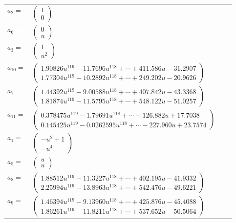 \documentclass[1p]{elsarticle_modified}
\theoremstyle{definition}
\begin{document}
\begin{tabular}{m{7pt} m{180pt} m{7pt} m{180pt} }
\flushright $a_{2}=$&$\begin{pmatrix}1\\0\end{pmatrix}$ \\
\flushright $a_{6}=$&$\begin{pmatrix}0\\u\end{pmatrix}$ \\
\flushright $a_{3}=$&$\begin{pmatrix}1\\u^2\end{pmatrix}$ \\
\flushright $a_{10}=$&$\begin{pmatrix}1.90826 u^{119}-11.7696 u^{118}+\cdots+411.586 u-31.2907\\1.77304 u^{119}-10.2892 u^{118}+\cdots+249.202 u-20.9626\end{pmatrix}$ \\
\flushright $a_{7}=$&$\begin{pmatrix}1.44392 u^{119}-9.00588 u^{118}+\cdots+407.842 u-43.3368\\1.81874 u^{119}-11.5795 u^{118}+\cdots+548.122 u-51.0257\end{pmatrix}$ \\
\flushright $a_{11}=$&$\begin{pmatrix}0.378475 u^{119}-1.79691 u^{118}+\cdots-126.882 u+17.7038\\0.145425 u^{119}-0.0262595 u^{118}+\cdots-227.960 u+23.7574\end{pmatrix}$ \\
\flushright $a_{1}=$&$\begin{pmatrix}- u^2+1\\- u^4\end{pmatrix}$ \\
\flushright $a_{5}=$&$\begin{pmatrix}u\\u\end{pmatrix}$ \\
\flushright $a_{8}=$&$\begin{pmatrix}1.88512 u^{119}-11.3227 u^{118}+\cdots+402.195 u-41.9332\\2.25994 u^{119}-13.8963 u^{118}+\cdots+542.476 u-49.6221\end{pmatrix}$ \\
\flushright $a_{9}=$&$\begin{pmatrix}1.46394 u^{119}-9.13960 u^{118}+\cdots+425.876 u-45.4088\\1.86261 u^{119}-11.8211 u^{118}+\cdots+537.652 u-50.5064\end{pmatrix}$ \\

\end{tabular}
\end{document}
